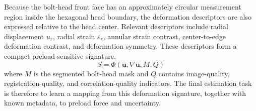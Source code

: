 Because the bolt-head front face has an approximately circular measurement region inside the hexagonal head boundary, the deformation descriptors are also expressed relative to the head center. Relevant descriptors include radial displacement $u_r$, radial strain $\varepsilon_r$, annular strain contrast, center-to-edge deformation contrast, and deformation symmetry. These descriptors form a compact preload-sensitive signature,
\begin{equation}
    S = \Phi\left(\mathbf{u},\nabla \mathbf{u},M,Q\right)
    \label{eq:signature}
\end{equation}
where $M$ is the segmented bolt-head mask and $Q$ contains image-quality, registration-quality, and correlation-quality indicators. The final estimation task is therefore to learn a mapping from this deformation signature, together with known metadata, to preload force and uncertainty.



